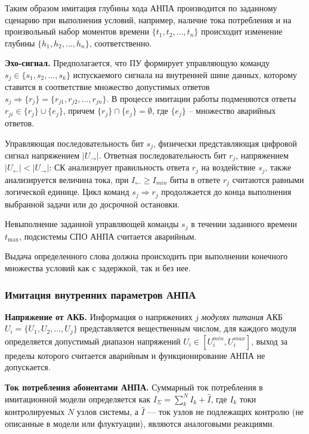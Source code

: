 Таким образом имитация глубины хода АНПА производится по заданному сценарию
при выполнения условий, например, наличие тока потребления
и на произвольный набор моментов времени $\{t_1, t_2, \ldots, t_n\}$
происходит изменение глубины $\{h_1, h_2, \ldots, h_n\}$, соответственно.


\textbf{Эхо-сигнал.}
Предполагается, что ПУ формирует управляющую команду $s_j \in \{s_1, s_2, \ldots, s_k\}$ испускаемого сигнала на внутренней шине данных,
которому ставится в соответствие множество допустимых ответов $s_j \Rightarrow \{r_j\} = \{r_{j1}, r_{j2}, \ldots, r_{jn}\}$.
В процессе имитации работы подменяются ответы
$r_{ji} \in \{r_j\} \cup \{e_j\}$, причем $\{r_j\} \cap \{e_j\} = \emptyset$,
где $\{e_j\}$ -- множество аварийных ответов.


Управляющая последовательность бит $s_j$, физически представляющая цифровой сигнал напряжением $|U_{\longrightarrow}|$.
Ответная последовательность бит $r_j$, напряжением $|U_{\longleftarrow}| < |U_{\longrightarrow}|$:
СК анализирует правильность ответа $r_j$ на воздействие $s_j$,
также анализируется величина тока, при $I_{\longleftarrow} \geq I_{min}$ биты в ответе $r_j$ считаются равными логической единице.
Цикл команд $s_j \Rightarrow r_j$ продолжается до конца выполнения выбранной задачи или до досрочной остановки.

Невыполнение заданной управляющей команды $s_j$ в течении заданного времени $t_{\mbox{max}}$,
подсистемы СПО АНПА считается аварийным.

Выдача определенного слова должна происходить при выполнении конечного множества условий как с задержкой, так и без нее.


\subsubsection{Имитация внутренних параметров АНПА}\label{sec:model_anpa:inner_params}
\textbf{Напряжение от АКБ.}
Информация о напряжениях $j$ \textit{модулях питания} АКБ $U_i = \{U_1, U_2, \ldots, U_j\}$ представляется вещественным числом,
для каждого модуля определяется допустимый диапазон напряжений $U_i \in [U_i^{min}, U_i^{max}]$,
выход за пределы которого считается аварийным и функционирование АНПА не допускается.

\textbf{Ток потребления абонентами АНПА.}
Суммарный ток потребления в имитационной модели определяется как $I_\Sigma = \sum_k^N I_k + \hat I$,
где $I_k$ токи контролируемых $N$ узлов системы, а $\hat I$ --- ток узлов не подлежащих контролю (не описанные в модели или флуктуации),
являются аналоговыми реакциями. %

